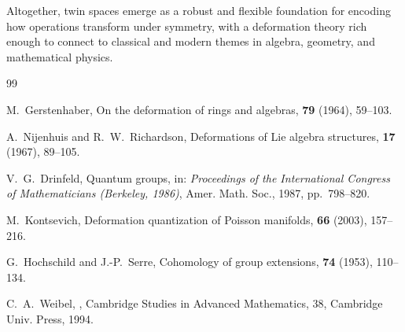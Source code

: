 \documentclass[11pt,a4paper]{article}
\numberwithin{equation}{section}
\begin{document}
	Altogether, twin spaces emerge as a robust and flexible foundation for encoding how operations transform
	under symmetry, with a deformation theory rich enough to connect to classical and modern themes in algebra,
	geometry, and mathematical physics.
	
	\begin{thebibliography}{99}
		
		M.~Gerstenhaber,
		\newblock On the deformation of rings and algebras,
		 \textbf{79} (1964), 59--103.
		
		A.~Nijenhuis and R.~W.~Richardson,
		\newblock Deformations of Lie algebra structures,
		 \textbf{17} (1967), 89--105.
		
		V.~G.~Drinfeld,
		\newblock Quantum groups,
		\newblock in: {\em Proceedings of the International Congress of Mathematicians (Berkeley, 1986)}, 
		\newblock Amer. Math. Soc., 1987, pp.~798--820.
		
		M.~Kontsevich,
		\newblock Deformation quantization of Poisson manifolds,
		 \textbf{66} (2003), 157--216.
		
		G.~Hochschild and J.-P.~Serre,
		\newblock Cohomology of group extensions,
		 \textbf{74} (1953), 110--134.
		
		C.~A.~Weibel,
		,
		\newblock Cambridge Studies in Advanced Mathematics, 38, Cambridge Univ. Press, 1994.
		
	\end{thebibliography}
	
\end{document}
